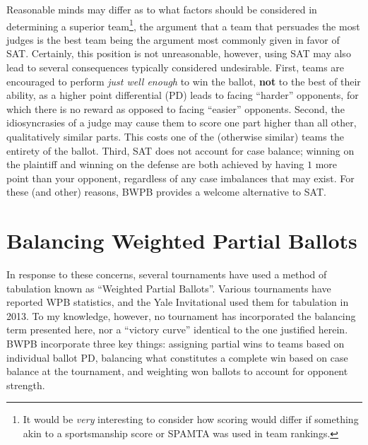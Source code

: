 \documentclass{article}
\begin{document}
Reasonable minds may differ as to what factors should be considered in determining a superior team\footnote{It would be \textit{very} interesting to consider how scoring would differ if something akin to a sportsmanship score or SPAMTA was used in team rankings.}, the argument that a team that persuades the most judges is the best team being the argument most commonly given in favor of SAT.  Certainly, this position is not unreasonable, however, using SAT may also lead to several consequences typically considered undesirable.  First, teams are encouraged to perform \textit{just well enough} to win the ballot, \textbf{not} to the best of their ability, as a higher point differential (PD) leads to facing ``harder'' opponents, for which there is no reward as opposed to facing ``easier'' opponents.  Second, the idiosyncrasies of a judge may cause them to score one part higher than all other, qualitatively similar parts.  This costs one of the (otherwise similar) teams the entirety of the ballot.  Third, SAT does not account for case balance; winning on the plaintiff and winning on the defense are both achieved by having $1$ more point than your opponent, regardless of any case imbalances that may exist.  For these (and other) reasons, BWPB provides a welcome alternative to SAT.
\section{Balancing Weighted Partial Ballots}
In response to these concerns, several tournaments have used a method of tabulation known as ``Weighted Partial Ballots''.  Various tournaments have reported WPB statistics, and the Yale Invitational used them for tabulation in 2013.  To my knowledge, however, no tournament has incorporated the balancing term presented here, nor a ``victory curve'' identical to the one justified herein.  BWPB incorporate three key things:  assigning partial wins to teams based on individual ballot PD, balancing what constitutes a complete win based on case balance at the tournament, and weighting won ballots to account for opponent strength.
\end{document}
